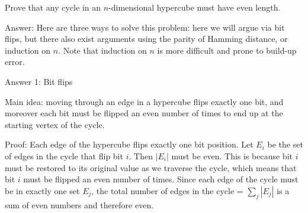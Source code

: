 \question Prove that any cycle in an $n$-dimensional hypercube must 
have even length.
\begin{solution}[3in]
Answer: Here are three ways to solve this problem: here we will argue 
via bit flips, but there also exist arguments using the parity of 
Hamming distance, or induction on $n$. Note that induction on $n$ 
is more difficult and prone to build-up error.
					
Answer 1: Bit flips
					
Main idea: moving through an edge in a hypercube flips exactly one 
bit, and moreover each bit must be flipped an even number of times 
to end up at the starting vertex of the cycle.
					
Proof: Each edge of the hypercube flips exactly one bit position. 
Let $E_i$ be the set of edges in the cycle that flip bit $i$. Then 
$|E_i|$ must be even. This is because bit $i$ must be restored to 
its original value as we traverse the cycle, which means that bit 
$i$ must be flipped an even number of times. Since each edge of the 
cycle must be in exactly one set $E_j$, the total number of edges in 
the cycle = $\sum_j |E_j|$ is a sum of even numbers and therefore even. 
				
\end{solution}
